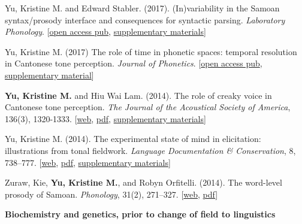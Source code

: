 \documentclass[10pt]{article}
\newcommand{\blankline}{\quad\pagebreak[3]}
\newcommand{\halfblankline}{\quad\vspace{-0.5\baselineskip}\pagebreak[3]}
\begin{document}
\begin{bibenum}
      \item Yu, Kristine M. and Edward Stabler. (2017).
        (In)variability in the Samoan syntax/prosody interface and consequences for
        syntactic parsing. \emph{Laboratory Phonology}. [\href{https://www.journal-labphon.org/articles/10.5334/labphon.113/}{open access pub}, \href{https://doi.org/10.5334/labphon.113.s1}{supplementary materials}]
    \item Yu, Kristine M. (2017) The role of time in phonetic
      spaces: temporal resolution in Cantonese tone
      perception. \emph{Journal of Phonetics}. [\href{https://doi.org/10.1016/j.wocn.2017.06.004}{open access pub}, \href{https://github.com/krismyu/resolution}{supplementary material}]
    \item \textbf{Yu, Kristine M.} and Hiu Wai Lam. (2014). The role of
      creaky voice in Cantonese tone perception. \emph{The Journal of
        the Acoustical Society of America}, 136(3), 1320-1333.
      [\href{http://scitation.aip.org/content/asa/journal/jasa/136/3/10.1121/1.4887462}{web},
      \href{http://www.krisyu.org/pages/pdfs/yulam2014-jasa-cantcr.pdf}{pdf},
      \href{http://www.krisyu.org/blog/supp-material-cantonese-creak-perception.html}{supplementary materials}]

    \item Yu, Kristine M. (2014). The experimental state of mind in
      elicitation: illustrations from tonal fieldwork. \emph{Language Documentation \&
        Conservation}, 8, 738--777. 
      [\href{http://scholarspace.manoa.hawaii.edu/bitstream/handle/10125/24623/Yu.pdf?sequence=1}{web},
      \href{http://www.krisyu.org/pages/pdfs/yu2014-kiy.pdf}{pdf}, 
      \href{http://www.krisyu.org/blog/ldc-kiy-overview.html}{supplementary materials}]

    \item Zuraw, Kie, \textbf{Yu, Kristine M.}, and Robyn Orfitelli. (2014). The word-level prosody of
      {S}amoan. \emph{Phonology}, 31(2), 271--327.
      [\href{http://dx.doi.org/10.1017/S095267571400013X}{web},
      \href{http://www.krisyu.org/pages/pdfs/zurawyuorfitelli2014.pdf}{pdf}]

\end{bibenum}

\blankline

\blankline

\textbf{Biochemistry and genetics, prior to change of field to linguistics} \hfill 

\halfblankline
\end{document}
